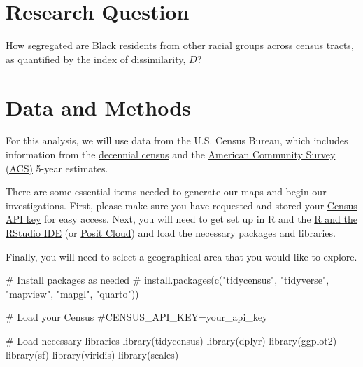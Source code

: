 \documentclass[
  letterpaper,
  DIV=11,
  numbers=noendperiod]{scrartcl}
\newenvironment{Shaded}{\begin{snugshade}}{\end{snugshade}}
\newcommand{\CommentTok}[1]{\textcolor[rgb]{0.37,0.37,0.37}{#1}}
\newcommand{\FunctionTok}[1]{\textcolor[rgb]{0.28,0.35,0.67}{#1}}
\newcommand{\NormalTok}[1]{\textcolor[rgb]{0.00,0.23,0.31}{#1}}
\begin{document}
\section{Research Question}\label{research-question}

How segregated are Black residents from other racial groups across
census tracts, as quantified by the index of dissimilarity, \(D\)?

\section{Data and Methods}\label{data-and-methods}

For this analysis, we will use data from the U.S. Census Bureau, which
includes information from the
\href{https://www.census.gov/programs-surveys/decennial-census.html}{decennial
census} and the
\href{https://www.census.gov/programs-surveys/acs.html}{American
Community Survey (ACS)} 5-year estimates.

There are some essential items needed to generate our maps and begin our
investigations. First, please make sure you have requested and stored
your \href{https://api.census.gov/data/key_signup.html}{Census API key}
for easy access. Next, you will need to get set up in R and the
\href{https://www.google.com/url?sa=t&source=web&rct=j&opi=89978449&url=https://posit.co/products/open-source/rstudio/&ved=2ahUKEwjHgNqLouWPAxX8FlkFHS1VCBoQFnoECBkQAQ&usg=AOvVaw2_EHeeDq6zN5gnktCVwGMF}{R
and the RStudio IDE} (or \href{https://posit.cloud/}{Posit Cloud}) and
load the necessary packages and libraries.

Finally, you will need to select a geographical area that you would like
to explore.

\begin{Shaded}
\begin{Highlighting}[]
\CommentTok{\# Install packages as needed}
\CommentTok{\# install.packages(c("tidycensus", "tidyverse", "mapview", "mapgl", "quarto"))}

\CommentTok{\# Load your Census}
\CommentTok{\#CENSUS\_API\_KEY=\textquotesingle{}your\_api\_key\textquotesingle{}}

\CommentTok{\# Load necessary libraries}
\FunctionTok{library}\NormalTok{(tidycensus)}
\FunctionTok{library}\NormalTok{(dplyr)}
\FunctionTok{library}\NormalTok{(ggplot2)}
\FunctionTok{library}\NormalTok{(sf)}
\FunctionTok{library}\NormalTok{(viridis)}
\FunctionTok{library}\NormalTok{(scales)}
\end{Highlighting}
\end{Shaded}
\end{document}

